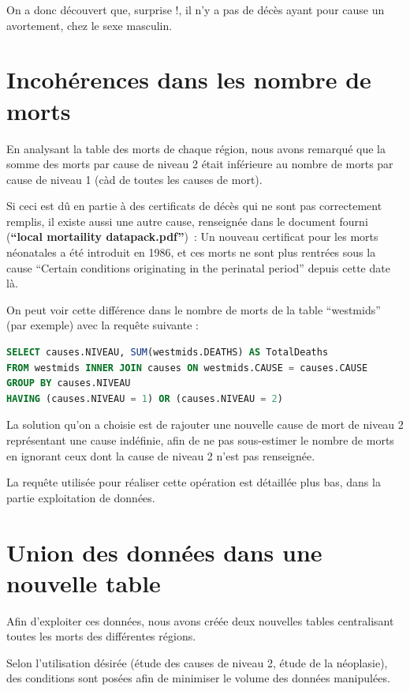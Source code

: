     On a donc découvert que, surprise !, il n'y a pas de décès ayant pour cause un avortement, chez le sexe masculin.

\section{Incohérences dans les nombre de morts}

    En analysant la table des morts de chaque région, nous avons remarqué que la somme des morts par cause de niveau 2 était
    inférieure au nombre de morts par cause de niveau 1 (càd de toutes les causes de mort).

    Si ceci est dû en partie à des certificats de décès qui ne sont pas correctement remplis, il existe aussi une autre cause,
    renseignée dans le document fourni (\textbf{``local mortaility datapack.pdf''})~: Un nouveau certificat pour les morts néonatales
    a été introduit en 1986, et ces morts ne sont plus rentrées sous la cause ``Certain conditions originating in the perinatal
    period'' depuis cette date là.

    On peut voir cette différence dans le nombre de morts de la table ``westmids'' (par exemple) avec la requête suivante :

    \begin{lstlisting}[frame=single, language=SQL]
SELECT causes.NIVEAU, SUM(westmids.DEATHS) AS TotalDeaths
FROM westmids INNER JOIN causes ON westmids.CAUSE = causes.CAUSE
GROUP BY causes.NIVEAU
HAVING (causes.NIVEAU = 1) OR (causes.NIVEAU = 2)
    \end{lstlisting}

    La solution qu'on a choisie est de rajouter une nouvelle cause de mort de niveau 2 représentant une cause indéfinie, afin
    de ne pas sous-estimer le nombre de morts en ignorant ceux dont la cause de niveau 2 n'est pas renseignée.

    La requête utilisée pour réaliser cette opération est détaillée plus bas, dans la partie exploitation de données.

\section{Union des données dans une nouvelle table}

    Afin d'exploiter ces données, nous avons créée deux nouvelles tables centralisant toutes les morts des différentes régions.

    Selon l'utilisation désirée (étude des causes de niveau 2, étude de la néoplasie), des conditions sont posées afin
    de minimiser le volume des données manipulées.

